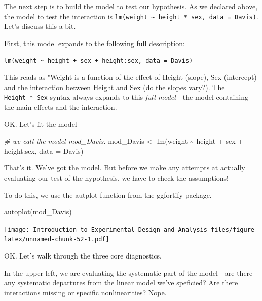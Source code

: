 \documentclass[
]{book}
\newenvironment{Shaded}{\begin{snugshade}}{\end{snugshade}}
\newcommand{\AttributeTok}[1]{\textcolor[rgb]{0.77,0.63,0.00}{#1}}
\newcommand{\CommentTok}[1]{\textcolor[rgb]{0.56,0.35,0.01}{\textit{#1}}}
\newcommand{\FunctionTok}[1]{\textcolor[rgb]{0.00,0.00,0.00}{#1}}
\newcommand{\NormalTok}[1]{#1}
\newcommand{\OtherTok}[1]{\textcolor[rgb]{0.56,0.35,0.01}{#1}}
\newcommand{\SpecialCharTok}[1]{\textcolor[rgb]{0.00,0.00,0.00}{#1}}
\begin{document}
The next step is to build the model to test our hypothesis. As we declared above, the model to test the interaction is \texttt{lm(weight\ \textasciitilde{}\ height\ *\ sex,\ data\ =\ Davis)}. Let's discuss this a bit.

First, this model expands to the following full description:

\texttt{lm(weight\ \textasciitilde{}\ height\ +\ sex\ +\ height:sex,\ data\ =\ Davis)}

This reads as "Weight is a function of the effect of Height (slope), Sex (intercept) and the interaction between Height and Sex (do the slopes vary?). The \texttt{Height\ *\ Sex} syntax always expands to this \emph{full model} - the model containing the main effects and the interaction.

OK. Let's fit the model

\begin{Shaded}
\begin{Highlighting}[]
\CommentTok{\# we call the model mod\_Davis.}
\NormalTok{mod\_Davis }\OtherTok{\textless{}{-}} \FunctionTok{lm}\NormalTok{(weight }\SpecialCharTok{\textasciitilde{}}\NormalTok{ height }\SpecialCharTok{+}\NormalTok{ sex }\SpecialCharTok{+}\NormalTok{ height}\SpecialCharTok{:}\NormalTok{sex, }\AttributeTok{data =}\NormalTok{ Davis)}
\end{Highlighting}
\end{Shaded}

That's it. We've got the model. But before we make any attempts at actually evaluating our test of the hypothesis, we have to check the assumptions!

To do this, we use the autplot function from the ggfortify package.

\begin{Shaded}
\begin{Highlighting}[]
\FunctionTok{autoplot}\NormalTok{(mod\_Davis)}
\end{Highlighting}
\end{Shaded}

\texttt{[image: Introduction-to-Experimental-Design-and-Analysis\_files/figure-latex/unnamed-chunk-52-1.pdf]}

OK. Let's walk through the three core diagnostics.

In the upper left, we are evaluating the systematic part of the model - are there any systematic departures from the linear model we've speficied? Are there interactions missing or specific nonlinearities? Nope.
\end{document}

